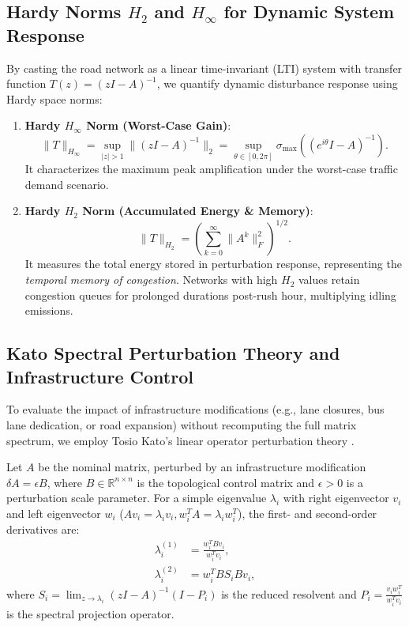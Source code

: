 \documentclass[lettersize,journal]{IEEEtran}
\begin{document}
\subsection{Hardy Norms $H_2$ and $H_\infty$ for Dynamic System Response}
By casting the road network as a linear time-invariant (LTI) system with transfer function $T(z) = (zI - A)^{-1}$, we quantify dynamic disturbance response using Hardy space norms:
\begin{enumerate}
    \item \textbf{Hardy $H_\infty$ Norm (Worst-Case Gain)}:
    \begin{equation}
    \|T\|_{H_\infty} = \sup_{|z| > 1} \|(zI - A)^{-1}\|_2 = \sup_{\theta \in [0, 2\pi]} \sigma_{\max}\left( (e^{i\theta}I - A)^{-1} \right).
    \end{equation}
    It characterizes the maximum peak amplification under the worst-case traffic demand scenario.
    \item \textbf{Hardy $H_2$ Norm (Accumulated Energy \& Memory)}:
    \begin{equation}
    \|T\|_{H_2} = \left( \sum_{k=0}^{\infty} \| A^k \|_F^2 \right)^{1/2}.
    \end{equation}
    It measures the total energy stored in perturbation response, representing the \emph{temporal memory of congestion}. Networks with high $H_2$ values retain congestion queues for prolonged durations post-rush hour, multiplying idling emissions.
\end{enumerate}

\subsection{Kato Spectral Perturbation Theory and Infrastructure Control}
To evaluate the impact of infrastructure modifications (e.g., lane closures, bus lane dedication, or road expansion) without recomputing the full matrix spectrum, we employ Tosio Kato's linear operator perturbation theory \cite{Kato1995}.

Let $A$ be the nominal matrix, perturbed by an infrastructure modification $\delta A = \epsilon B$, where $B \in \mathbb{R}^{n \times n}$ is the topological control matrix and $\epsilon > 0$ is a perturbation scale parameter. For a simple eigenvalue $\lambda_i$ with right eigenvector $v_i$ and left eigenvector $w_i$ ($A v_i = \lambda_i v_i, w_i^T A = \lambda_i w_i^T$), the first- and second-order derivatives are:
\begin{align}
\lambda_i^{(1)} &= \frac{w_i^T B v_i}{w_i^T v_i}, \label{eq:kato1} \\
\lambda_i^{(2)} &= w_i^T B S_i B v_i, \label{eq:kato2}
\end{align}
where $S_i = \lim_{z \to \lambda_i} (zI - A)^{-1}(I - P_i)$ is the reduced resolvent and $P_i = \frac{v_i w_i^T}{w_i^T v_i}$ is the spectral projection operator.
\end{document}
